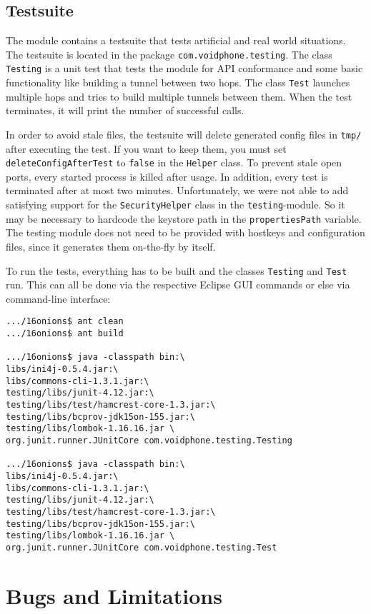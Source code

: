 \documentclass{article}
\begin{document}
\subsection{Testsuite}
The module contains a testsuite that tests artificial and real world situations. The testsuite is
located in the package \texttt{com.voidphone.testing}. The class \texttt{Testing} is a unit test
that tests the module for API conformance and some basic functionality like building a tunnel
between two hops. The class \texttt{Test} launches multiple hops and tries to build multiple
tunnels between them. When the test terminates, it will print the number of successful calls.

In order to avoid stale files, the testsuite will delete generated config files in \texttt{tmp/}
after executing the test. If you want to keep them, you must set \texttt{deleteConfigAfterTest}
to \texttt{false} in the \texttt{Helper} class. To prevent stale open ports, every started process
is killed after usage. In addition, every test is terminated after at most two minutes.
Unfortunately, we were not able to add satisfying support for the \texttt{SecurityHelper} class in
the \texttt{testing}-module. So it may be necessary to hardcode the keystore path in the
\texttt{propertiesPath} variable.
The testing module does not need to be provided with hostkeys and configuration files, since it generates them on-the-fly by itself.

To run the tests, everything has to be built and the classes \texttt{Testing} and \texttt{Test} run. This can all be done via the respective Eclipse GUI commands or else via command-line interface:

\begin{lstlisting}
.../16onions$ ant clean
.../16onions$ ant build

.../16onions$ java -classpath bin:\
libs/ini4j-0.5.4.jar:\
libs/commons-cli-1.3.1.jar:\
testing/libs/junit-4.12.jar:\
testing/libs/test/hamcrest-core-1.3.jar:\
testing/libs/bcprov-jdk15on-155.jar:\
testing/libs/lombok-1.16.16.jar \
org.junit.runner.JUnitCore com.voidphone.testing.Testing

.../16onions$ java -classpath bin:\
libs/ini4j-0.5.4.jar:\
libs/commons-cli-1.3.1.jar:\
testing/libs/junit-4.12.jar:\
testing/libs/test/hamcrest-core-1.3.jar:\
testing/libs/bcprov-jdk15on-155.jar:\
testing/libs/lombok-1.16.16.jar \
org.junit.runner.JUnitCore com.voidphone.testing.Test
\end{lstlisting}

\section{Bugs and Limitations}
\end{document}
